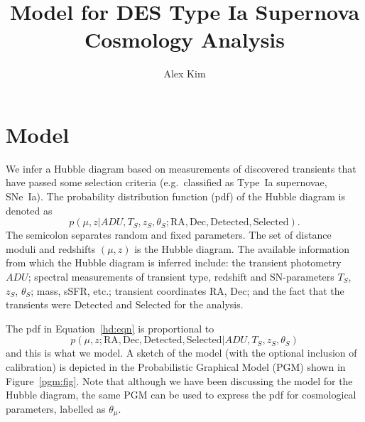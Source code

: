 \documentclass[preprint]{aastex}
\begin{document}
\title{Model for DES Type Ia Supernova Cosmology Analysis}
\author{Alex Kim}

\section{Model}
We infer a Hubble diagram based on measurements of discovered transients
that have passed some selection criteria (e.g.\ classified as Type~Ia supernovae, SNe~Ia).  The probability distribution
function (pdf) of the Hubble diagram is denoted as
\begin{equation}
p({\mu},{z} |  {{ADU}}, {{T}}_S,{{z}}_S,
{{\theta}}_S;
{\text{RA}}, {\text{Dec}}, \text{Detected}, {\text{Selected}}).
\label{hd:eqn}
\end{equation}
The semicolon separates random and fixed parameters.
The set of distance moduli
and redshifts $(\mu, z)$ is the Hubble diagram.  The available information
from which the Hubble diagram is inferred include:
the transient photometry ${ADU}$; spectral measurements of
transient
type, redshift and SN-parameters ${T}_S$, ${z}_S$, ${\theta}_S$;
mass, sSFR, etc.; transient coordinates  $\text{RA}$, $\text{Dec}$;
and the fact that the transients were Detected and Selected for the analysis.

The pdf in Equation~\ref{hd:eqn} is proportional to
\begin{equation}
p({\mu},{z}; \text{RA}, \text{Dec},  \text{Detected}, {\text{Selected}}
 |  {{ADU}}, {{T}}_S,{{z}}_S,
{{\theta}}_S)
\label{hd2:eqn}
\end{equation}
and this is what we model.  A sketch of the model (with the optional inclusion
of calibration) is depicted in the Probabilistic Graphical Model
(PGM)
shown in Figure~\ref{pgm:fig}.
Note that although we have been discussing the model for the Hubble diagram, the same PGM can
 be used to express the pdf for cosmological
parameters, labelled as $\theta_\mu$.
\end{document}
